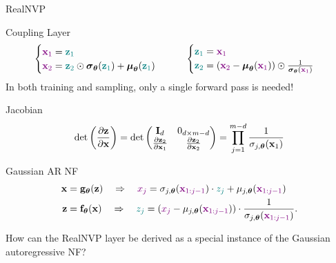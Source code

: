 \documentclass{beamer}
\begin{document}
\begin{frame}{RealNVP}
	\begin{block}{Coupling Layer}
		\vspace{-0.7cm}
		\[
		 \begin{cases} {\color{violet}\mathbf{x}_1} = {\color{teal}\mathbf{z}_1} \\ {\color{violet}\mathbf{x}_2} = {\color{teal}\mathbf{z}_2} \odot \boldsymbol{\sigma}_{\boldsymbol{\theta}}({\color{teal}\mathbf{z}_1}) + \boldsymbol{\mu}_{\boldsymbol{\theta}}({\color{teal}\mathbf{z}_1}) \end{cases}
			\qquad
		\begin{cases} {\color{teal}\mathbf{z}_1} ={\color{violet} \mathbf{x}_1} \\ {\color{teal}\mathbf{z}_2} = ({\color{violet}\mathbf{x}_2} - \boldsymbol{\mu}_{\boldsymbol{\theta}}({\color{violet}\mathbf{x}_1})) \odot \frac{1}{\boldsymbol{\sigma}_{\boldsymbol{\theta}}({\color{violet}\mathbf{x}_1})} \end{cases}
		\]
		In both training and sampling, only a single forward pass is needed!
	\end{block}
	\begin{block}{Jacobian}
		\vspace{-0.5cm}
		\[
		\det \left( \frac{\partial \mathbf{z}}{\partial \mathbf{x}} \right) = \det 
		\begin{pmatrix}
			\mathbf{I}_d & 0_{d \times m-d} \\
			\frac{\partial \mathbf{z}_2}{\partial \mathbf{x}_1} & \frac{\partial \mathbf{z}_2}{\partial \mathbf{x}_2}
		\end{pmatrix} = \prod_{j=1}^{m-d} \frac{1}{\sigma_{j, \boldsymbol{\theta}}(\mathbf{x}_1)}
		\]
		\vspace{-0.5cm}
	\end{block}
	\begin{block}{Gaussian AR NF}
		\vspace{-0.7cm}
		\begin{align*}
			\mathbf{x} &= \mathbf{g}_{\boldsymbol{\theta}}(\mathbf{z}) \quad \Rightarrow \quad {\color{violet}x_j} = \sigma_{j, \boldsymbol{\theta}} ({\color{violet}\mathbf{x}_{1:j-1}}) \cdot {\color{teal} z_j} + \mu_{j, \boldsymbol{\theta}}({\color{violet}\mathbf{x}_{1:j-1}}) \\
			\mathbf{z} &= \mathbf{f}_{\boldsymbol{\theta}}(\mathbf{x}) \quad \Rightarrow \quad {\color{teal} z_j} = \left({\color{violet} x_j} - \mu_{j, \boldsymbol{\theta}}({\color{violet}\mathbf{x}_{1:j-1}}) \right) \cdot \frac{1}{\sigma_{j, \boldsymbol{\theta}} ({\color{violet} \mathbf{x}_{1:j-1}}) }.
		\end{align*}
		\vspace{-0.5cm}
	\end{block}
	How can the RealNVP layer be derived as a special instance of the Gaussian autoregressive NF?
	
\end{frame}
\end{document}
